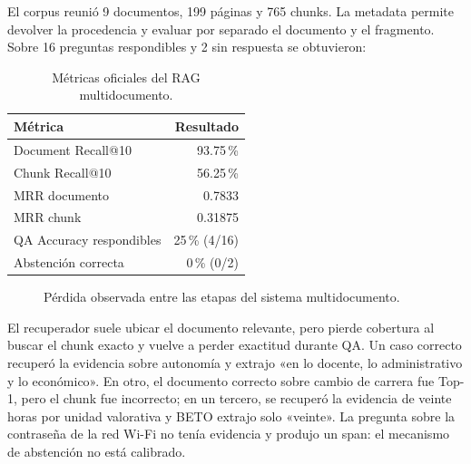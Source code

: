 \documentclass[12pt,letterpaper]{article}
\begin{document}
El corpus reunió 9 documentos, 199 páginas y 765 chunks. La metadata permite
devolver la procedencia y evaluar por separado el documento y el fragmento.
Sobre 16 preguntas respondibles y 2 sin respuesta se obtuvieron:

\begin{table}[!htbp]
\centering
\small
\caption{Métricas oficiales del RAG multidocumento.}
\begin{tabular}{@{}lr@{}}
\toprule
\textbf{Métrica} & \textbf{Resultado}\\
\midrule
Document Recall@10 & 93.75\,\%\\
Chunk Recall@10 & 56.25\,\%\\
MRR documento & 0.7833\\
MRR chunk & 0.31875\\
QA Accuracy respondibles & 25\,\% (4/16)\\
Abstención correcta & 0\,\% (0/2)\\
\bottomrule
\end{tabular}
\end{table}

\begin{figure}[!htbp]
\centering
{}
\caption{Pérdida observada entre las etapas del sistema multidocumento.}
\label{fig:perdida-etapas}
\end{figure}

El recuperador suele ubicar el documento relevante, pero pierde cobertura al
buscar el chunk exacto y vuelve a perder exactitud durante QA. Un caso correcto
recuperó la evidencia sobre autonomía y extrajo «en lo docente, lo
administrativo y lo económico». En otro, el documento correcto sobre cambio
de carrera fue Top-1, pero el chunk fue incorrecto; en un tercero, se recuperó
la evidencia de veinte horas por unidad valorativa y BETO extrajo solo
«veinte». La pregunta sobre la contraseña de la red Wi-Fi no tenía evidencia
y produjo un span: el mecanismo de abstención no está calibrado.
\end{document}
